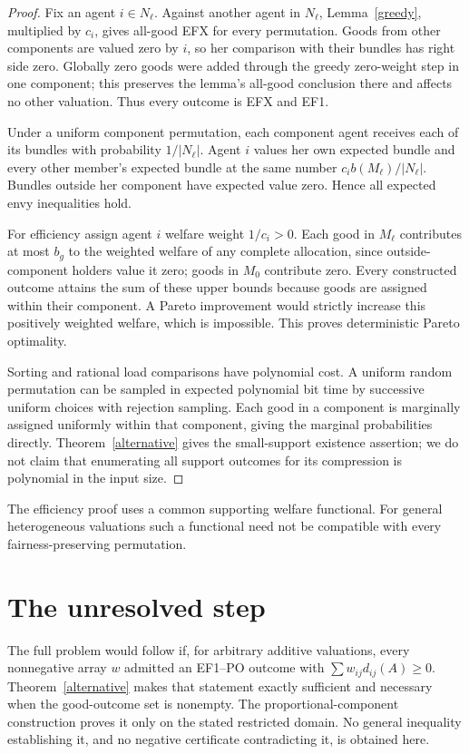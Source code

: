 \documentclass[11pt]{article}
\theoremstyle{definition}
\begin{document}
\begin{proof}
Fix an agent $i\in N_\ell$. Against another agent in $N_\ell$,
Lemma~\ref{greedy}, multiplied by $c_i$, gives all-good EFX for every
permutation. Goods from other components are valued zero by $i$, so her
comparison with their bundles has right side zero. Globally zero goods
were added through the greedy zero-weight step in one component; this
preserves the lemma's all-good conclusion there and affects no other
valuation. Thus every outcome is EFX and EF1.

Under a uniform component permutation, each component agent receives each
of its bundles with probability $1/|N_\ell|$. Agent $i$ values her own
expected bundle and every other member's expected bundle at the same
number $c_i b(M_\ell)/|N_\ell|$. Bundles outside her component have
expected value zero. Hence all expected envy inequalities hold.

For efficiency assign agent $i$ welfare weight $1/c_i>0$. Each good in
$M_\ell$ contributes at most $b_g$ to the weighted welfare of any complete
allocation, since outside-component holders value it zero; goods in $M_0$
contribute zero. Every constructed outcome attains the sum of these upper
bounds because goods are assigned within their component. A Pareto
improvement would strictly increase this positively weighted welfare,
which is impossible. This proves deterministic Pareto optimality.

Sorting and rational load comparisons have polynomial cost. A uniform
random permutation can be sampled in expected polynomial bit time by
successive uniform choices with rejection sampling. Each good in a component is marginally assigned uniformly
within that component, giving the marginal probabilities directly.
Theorem~\ref{alternative} gives the small-support existence assertion;
we do not claim that enumerating all support outcomes for its compression
is polynomial in the input size.
\end{proof}
The efficiency proof uses a common supporting welfare functional.
For general heterogeneous valuations such a functional need not be
compatible with every fairness-preserving permutation.

\section{The unresolved step}
The full problem would follow if, for arbitrary additive valuations,
every nonnegative array $w$ admitted an EF1--PO outcome with
$\sum w_{ij}d_{ij}(A)\ge0$. Theorem~\ref{alternative} makes that statement
exactly sufficient and necessary when the good-outcome set is nonempty.
The proportional-component construction proves it only on the stated
restricted domain. No general inequality establishing it, and no negative
certificate contradicting it, is obtained here.
\end{document}
